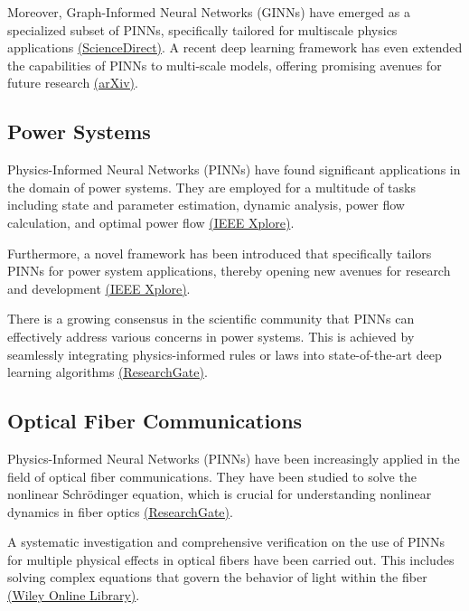 \documentclass[12pt]{article}
\begin{document}
	Moreover, Graph-Informed Neural Networks (GINNs) have emerged as a specialized subset of PINNs, specifically tailored for multiscale physics applications \href{https://www.sciencedirect.com/science/article/pii/S0021999121000875}{(ScienceDirect)}. A recent deep learning framework has even extended the capabilities of PINNs to multi-scale models, offering promising avenues for future research \href{https://arxiv.org/abs/2308.06672}{(arXiv)}.
	
	\subsection{Power Systems}
	Physics-Informed Neural Networks (PINNs) have found significant applications in the domain of power systems. They are employed for a multitude of tasks including state and parameter estimation, dynamic analysis, power flow calculation, and optimal power flow \href{https://ieeexplore.ieee.org/abstract/document/9743327}{(IEEE Xplore)}. 
	
	Furthermore, a novel framework has been introduced that specifically tailors PINNs for power system applications, thereby opening new avenues for research and development \href{https://ieeexplore.ieee.org/document/9282004}{(IEEE Xplore)}. 
	
	There is a growing consensus in the scientific community that PINNs can effectively address various concerns in power systems. This is achieved by seamlessly integrating physics-informed rules or laws into state-of-the-art deep learning algorithms \href{https://www.researchgate.net/publication/359487132_Applications_of_Physics-Informed_Neural_Networks_in_Power_Systems_-A_Review}{(ResearchGate)}.
	
	
	\subsection{Optical Fiber Communications}
	Physics-Informed Neural Networks (PINNs) have been increasingly applied in the field of optical fiber communications. They have been studied to solve the nonlinear Schrödinger equation, which is crucial for understanding nonlinear dynamics in fiber optics \href{https://www.researchgate.net/publication/361772364_Applications_of_Physics-Informed_Neural_Network_for_Optical_Fiber_Communications}{(ResearchGate)}. 
	
	A systematic investigation and comprehensive verification on the use of PINNs for multiple physical effects in optical fibers have been carried out. This includes solving complex equations that govern the behavior of light within the fiber \href{https://onlinelibrary.wiley.com/doi/10.1002/lpor.202100483}{(Wiley Online Library)}. 
	
\end{document}
